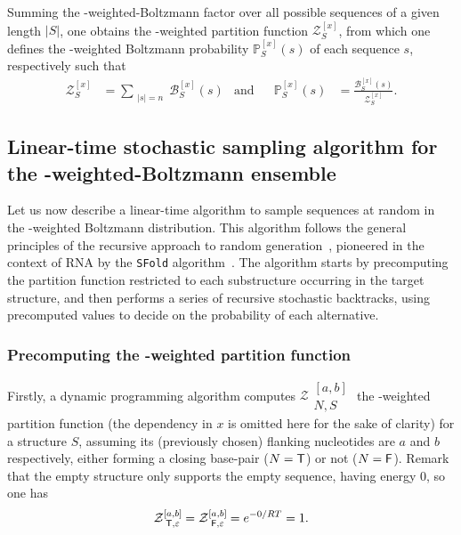\documentclass{bioinfo}
\newcommand{\SFold}{\texttt{SFold}\xspace}
\newcommand{\GCWeighted}{\Gb\Cb-weighted\xspace}
\newcommand{\Z}[2]{\mathcal{Z}{\substack{[#2]\\#1}}}
\newcommand{\B}{\mathcal{B}}
\newcommand{\Cb}{{\sf{C}}\xspace}
\newcommand{\Gb}{{\sf{G}}\xspace}
\newcommand{\Prob}{\mathbb{P}}
\newcommand{\Struct}{{S}}
\newcommand{\N}{{N}}
\newcommand{\BoolTrue}{{\sf T}}
\newcommand{\BoolFalse}{{\sf F}}
\begin{document}
Summing the \GCWeighted-Boltzmann factor over all possible sequences of a given length $|\Struct|$, one obtains the \GCWeighted partition function $\mathcal{Z}_{\Struct}^{[x]}$, from which one defines the \GCWeighted Boltzmann probability $\Prob_{\Struct}^{[x]}(s)$ of each sequence $s$, respectively such that 
\begin{align}\mathcal{Z}_{\Struct}^{[x]} &= \sum_{\substack{|s|=n}}\B_{\Struct}^{[x]}(s)& \text{and}&&
\Prob_{\Struct}^{[x]}(s) &= \frac{\B_{\Struct}^{[x]}(s)}{\mathcal{Z}_{\Struct}^{[x]}}.\label{def:distribution}\end{align}

\subsection{Linear-time stochastic sampling algorithm for the \GCWeighted-Boltzmann ensemble}

Let us now describe a linear-time algorithm to sample sequences at random in the \GCWeighted Boltzmann distribution. This algorithm follows the general principles of the recursive approach to random generation~\citep{Wilf1977}, pioneered in the context of RNA by the \SFold algorithm~\citep{Ding2003}. The algorithm starts by precomputing the partition function restricted to each substructure occurring in the target structure, and then performs a series of recursive stochastic backtracks, using precomputed values to decide on the probability of each alternative. 

\subsubsection{Precomputing the \GCWeighted partition function}\label{sec:pf}

Firstly, a dynamic programming algorithm computes $\Z{\N,\Struct}{a,b}$ the \GCWeighted partition function (the dependency in $x$ is omitted here for the sake of clarity) for a structure $\Struct$, assuming its (previously chosen) flanking nucleotides are $a$ and $b$ respectively, either forming a closing base-pair ($\N=\BoolTrue$) or not ($\N=\BoolFalse$).
Remark that the empty structure only supports the empty sequence, having energy $0$, so one has
\begin{equation}
	\Z{\BoolTrue,\varepsilon}{a,b}=\Z{\BoolFalse,\varepsilon}{a,b}= e^{-0/RT} = 1.
	\label{eq:Z_in}
\end{equation}
\end{document}
